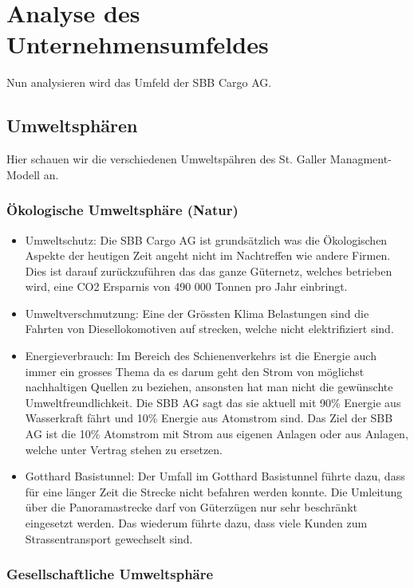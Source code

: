 \documentclass{article}
\begin{document}
\section{Analyse des Unternehmensumfeldes}

Nun analysieren wird das Umfeld der SBB Cargo AG.

\subsection{Umweltsphären}

Hier schauen wir die verschiedenen Umweltspähren des St. Galler Managment-Modell an.

\subsubsection{Ökologische Umweltsphäre (Natur)}

\begin{itemize}
\item Umweltschutz:
Die SBB Cargo AG ist grundsätzlich was die Ökologischen Aspekte der heutigen Zeit angeht nicht im Nachtreffen wie andere Firmen.
Dies ist darauf zurückzuführen das das ganze Güternetz, welches betrieben wird, eine CO2 Ersparnis von 490 000 Tonnen pro Jahr einbringt.

\item Umweltverschmutzung:
Eine der Grössten Klima Belastungen sind die Fahrten von Diesellokomotiven auf strecken, welche nicht elektrifiziert sind.   

\item Energieverbrauch: Im Bereich des Schienenverkehrs ist die Energie auch immer ein grosses Thema da es darum geht den Strom von möglichst nachhaltigen Quellen zu beziehen, ansonsten hat man nicht die gewünschte Umweltfreundlichkeit. 
Die SBB AG sagt das sie aktuell mit 90\% Energie aus Wasserkraft fährt und 10\% Energie aus Atomstrom sind. Das Ziel der SBB AG ist die 10\% Atomstrom mit Strom aus eigenen Anlagen oder aus Anlagen, welche unter Vertrag stehen zu ersetzen.
\item Gotthard Basistunnel:
Der Umfall im Gotthard Basistunnel führte dazu, dass für eine länger Zeit die Strecke nicht befahren werden konnte.
Die Umleitung über die Panoramastrecke darf von Güterzügen nur sehr beschränkt eingesetzt werden.
Das wiederum führte dazu, dass viele Kunden zum Strassentransport gewechselt sind.
\end{itemize}

\subsubsection{Gesellschaftliche Umweltsphäre}
\end{document}
